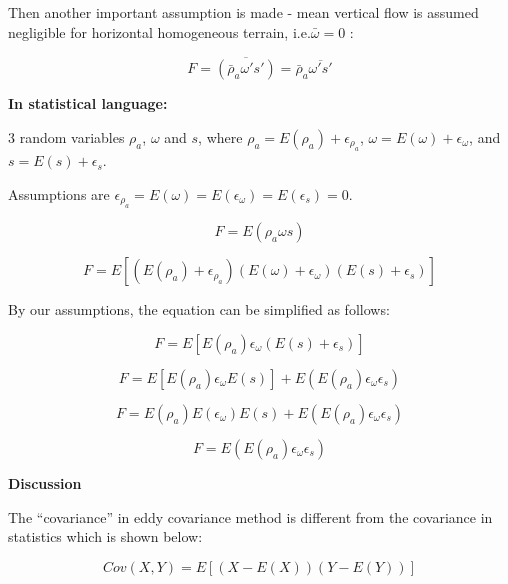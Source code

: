 \documentclass{article}\usepackage[]{graphicx}\usepackage[]{color}
\begin{document}
\begin{appendices}
Then another important assumption is made - mean vertical flow is assumed negligible for horizontal homogeneous terrain, i.e.$\bar{\omega}=0$ :

\begin{equation}
F = \overline{(\bar{\rho}_a\omega's')} = \bar{\rho}_a\overline{\omega's'}
\end{equation}

\textbf{In statistical language:}

3 random variables $\rho_a$, $\omega$ and $s$, where $\rho_a = E(\rho_a) + \epsilon_{\rho_a}$, $\omega = E(\omega)+\epsilon_{\omega}$, and $s = E(s) +\epsilon_s$.

Assumptions are $\epsilon_{\rho_a} =E(\omega)=E(\epsilon_\omega)=E(\epsilon_s)= 0$.

\begin{equation}
F = E(\rho_a\omega s)
\end{equation}

\begin{equation}
F = E[(E(\rho_a) + \epsilon_{\rho_a})(E(\omega)+\epsilon_\omega)(E(s)+\epsilon_s)]
\end{equation}

By our assumptions, the equation can be simplified as follows:

\begin{equation}
F = E[E(\rho_a)\epsilon_\omega(E(s)+\epsilon_s)]
\end{equation}

\begin{equation}
F = E[E(\rho_a)\epsilon_\omega E(s)] + E(E(\rho_a)\epsilon_\omega\epsilon_s)
\end{equation}


\begin{equation}
F = E(\rho_a)E(\epsilon_\omega)E(s) + E(E(\rho_a)\epsilon_\omega\epsilon_s)
\end{equation}

\begin{equation}
F =  E(E(\rho_a)\epsilon_\omega\epsilon_s)
\end{equation}

\textbf{Discussion}

The ``covariance'' in eddy covariance method is different from the covariance in statistics which is shown below:

\begin{equation}
Cov(X,Y) = E[(X-E(X))(Y-E(Y))]
\end{equation}

\newpage


\end{appendices}
\end{document}
